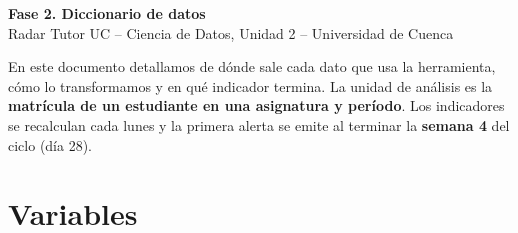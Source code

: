 \documentclass[10pt]{article}
\begin{document}
\begin{center}
{\Large\bfseries Fase 2. Diccionario de datos}\\[2pt]
Radar Tutor UC -- Ciencia de Datos, Unidad 2 -- Universidad de Cuenca
\end{center}

En este documento detallamos de dónde sale cada dato que usa la herramienta, cómo lo transformamos y en qué indicador termina. La unidad de análisis es la \textbf{matrícula de un estudiante en una asignatura y período}. Los indicadores se recalculan cada lunes y la primera alerta se emite al terminar la \textbf{semana 4} del ciclo (día 28).

\section{Variables}
\end{document}
